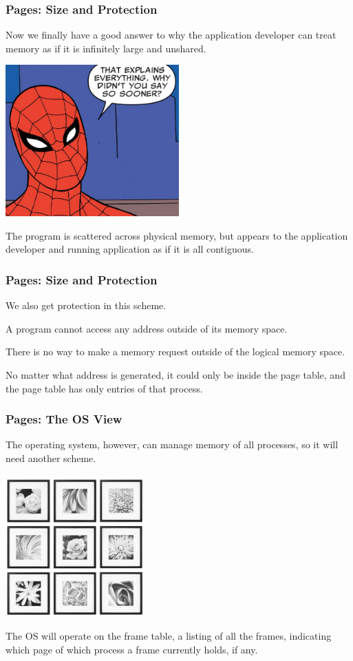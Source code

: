 \begin{frame}
\frametitle{Pages: Size and Protection}

Now we finally have a good answer to why the application developer can treat memory as if it is infinitely large and unshared. 

\begin{center}
	\includegraphics[width=0.5\textwidth]{images/explained.png}
\end{center}

The program is scattered across physical memory, but appears to the application developer and running application as if it is all contiguous. 

\end{frame}


\begin{frame}
\frametitle{Pages: Size and Protection}

We also get protection in this scheme.

A program cannot access any address outside of its memory space. 

There is no way to make a memory request outside of the logical memory space. 

No matter what address is generated, it could only be inside the page table, and the page table has only entries of that process.

\end{frame}

\begin{frame}
\frametitle{Pages: The OS View}

The operating system, however, can manage memory of all processes, so it will need another scheme. 

\begin{center}
	\includegraphics[width=0.4\textwidth]{images/frametable.png}
\end{center}

The OS will operate on the \alert{frame table}, a listing of all the frames, indicating which page of which process a frame currently holds, if any.


\end{frame}

